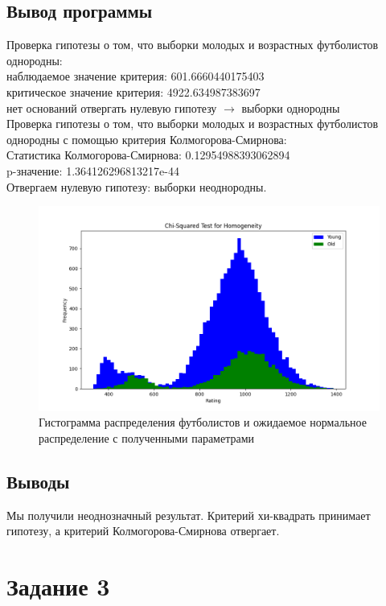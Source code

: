 \documentclass{article}
\begin{document}
\subsection{Вывод программы}
Проверка гипотезы о том, что выборки молодых и возрастных футболистов однородны: \\
наблюдаемое значение критерия: 601.6660440175403 \\ 
критическое значение критерия: 4922.634987383697 \\ 
нет оснований отвергать нулевую гипотезу $ \rightarrow $ выборки однородны \\ 
Проверка гипотезы о том, что выборки молодых и возрастных футболистов однородны с помощью критерия Колмогорова-Смирнова: \\ 
Статистика Колмогорова-Смирнова: 0.12954988393062894 \\
p-значение: 1.364126296813217e-44 \\ 
Отвергаем нулевую гипотезу: выборки неоднородны.  \\
\begin{figure}[H]
      \centering
      \includegraphics[width=1\linewidth]{../python/task2.png}
      \caption{Гистограмма распределения футболистов и ожидаемое нормальное распределение с полученными параметрами}\label{fig:figure}
\end{figure}
\subsection{Выводы}
Мы получили неоднозначный результат. Критерий хи-квадрать принимает гипотезу, а критерий Колмогорова-Смирнова отвергает.


\section{Задание 3}
\end{document}
